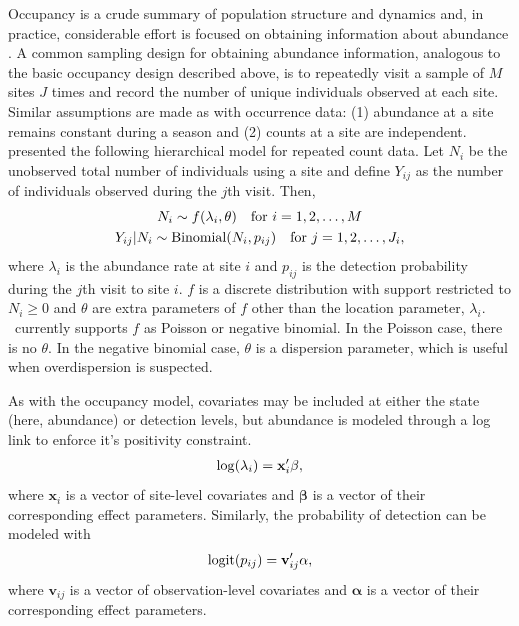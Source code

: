 \documentclass[article,shortnames]{jss}
\DeclareMathOperator{\logit}{logit}
\DeclareMathOperator{\Bin}{Binomial}
\newcommand{\um}{\pkg{unmarked}}
\begin{document}
Occupancy is a crude summary of population structure and dynamics and, in 
practice, considerable effort is focused on obtaining information about 
abundance \citep{dorazio07}. A common sampling design for obtaining 
abundance information, 
analogous to the basic occupancy design described above, is to 
repeatedly visit a sample of $M$ sites $J$ times and
record the number of unique individuals observed at each site.
Similar assumptions are made as with occurrence data: (1) abundance at
a site remains constant during a season and (2) counts at a site are
independent.  \citet{Royle2004} presented the following hierarchical model for
repeated count data.  Let $N_i$ be the unobserved total number of
individuals using a site and define $Y_{ij}$ as the number of individuals 
observed during the $j$th visit.  Then,
\begin{gather}
\label{eq:pc2}
  N_i \sim f(\lambda_i, \theta) \text{\quad for $i=1,2,\dots,M$}  \notag\\
  Y_{ij}|N_{i} \sim \Bin(N_i, p_{ij})\text{\quad for $j=1,2,\dots,J_{i}$} \notag,
\end{gather}
where $\lambda_i$ is the abundance rate at site $i$ and $p_{ij}$ is
the detection probability during the $j$th visit to site $i$.  $f$ is
a discrete distribution with support restricted to $N_{i} \ge 0$ and
$\theta$ are extra parameters of $f$ other than the location
parameter, $\lambda_{i}$.  \um\ currently supports $f$ as Poisson or
negative binomial.  In the Poisson case, there is no $\theta$.  In the
negative binomial case, $\theta$ is a dispersion parameter, which is
useful when overdispersion is suspected.

As with the occupancy model, covariates may be included at either the
state (here, abundance) or detection levels, but abundance is modeled
through a log link to enforce it's positivity constraint.
\begin{gather}
  \log(\lambda_i) = \mathbf x_i' \mathbf \beta, \notag
\end{gather}
where $\mathbf x_i$ is a vector of site-level covariates and $\mathbf \beta$
is a vector of their corresponding effect parameters.  Similarly, the
probability of detection can be modeled with
\begin{gather}
  \logit(p_{ij}) = \mathbf v_{ij}' \mathbf \alpha, \notag
\end{gather}
where $\mathbf v_{ij}$ is a vector of observation-level covariates and
$\mathbf \alpha$ is a vector of their corresponding effect parameters.
\end{document}

